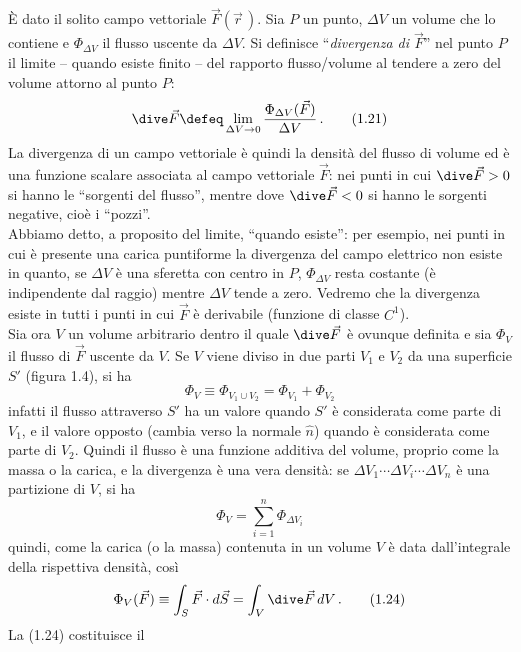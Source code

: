 \`E dato il solito campo vettoriale $\vec F(\vec r\,)$. Sia $P$ un punto,
$\Delta V$ un volume che lo contiene e $\Phi_{\Delta V}$ il flusso uscente da
$\Delta V$. Si definisce ``\emph{divergenza di $\vec F$}'' nel punto $P$ il
limite -- quando esiste finito -- del rapporto flusso/volume al tendere a zero
del volume attorno al punto $P$:
\begin{equation}
  \dive\vec F\defeq\lim_{\Delta V\to0}
  \frac{\Phi_{\Delta V}(\vec F)}{\Delta V}\,.
  \tag{1.21}
\end{equation}
La divergenza di un campo vettoriale \`e quindi la densit\`a del flusso di
volume ed \`e una funzione scalare associata al campo vettoriale $\vec F$: nei
punti in cui $\dive\vec F>0$ si hanno le ``sorgenti del flusso'', mentre dove
$\dive\vec F<0$ si hanno le sorgenti negative, cio\`e i ``pozzi''.\\
Abbiamo detto, a proposito del limite, ``quando esiste'': per esempio, nei punti
in cui \`e presente una carica puntiforme la divergenza del campo elettrico non
esiste in quanto, se $\Delta V$ \`e una sferetta con centro in $P$,
$\Phi_{\Delta V}$ resta costante (\`e indipendente dal raggio) mentre $\Delta V$
tende a zero. Vedremo che la divergenza esiste in tutti i punti in cui $\vec F$
\`e derivabile (funzione di classe $C^1$).\\
Sia ora $V$ un volume arbitrario dentro il quale $\dive\vec F$ \`e ovunque
definita e sia $\Phi_V$ il
flusso di $\vec F$ uscente da $V$. Se $V$ viene diviso in due parti $V_1$ e
$V_2$ da una superficie $S'$ (figura 1.4), si ha
\begin{equation}
  \Phi_V\equiv\Phi_{V_1\cup V_2}=\Phi_{V_1}+\Phi_{V_2}
  \tag{1.22}
\end{equation}
infatti il flusso attraverso $S'$ ha un valore quando $S'$ \`e considerata come
parte di $V_1$, e il valore opposto (cambia verso la normale $\hat n$) quando
\`e considerata come parte di $V_2$. Quindi il flusso \`e una funzione additiva
del volume, proprio come la massa o la carica, e la divergenza \`e una vera
densit\`a: se $\Delta V_1\cdots\Delta V_i\cdots\Delta V_n$ \`e una partizione di
$V$, si ha
\begin{equation}
  \Phi_V=\sum_{i=1}^n\Phi_{\Delta V_i}
  \tag{1.23}
\end{equation}
quindi, come la carica (o la massa) contenuta in un volume $V$ \`e data
dall'integrale della rispettiva densit\`a, cos\`i
\begin{equation}
  \Phi_V(\vec F)\equiv\int_S\vec F\cdot d\vec S=\int_V\dive\vec F\,dV\,.
  \tag{1.24}
\end{equation}
La (1.24) costituisce il

